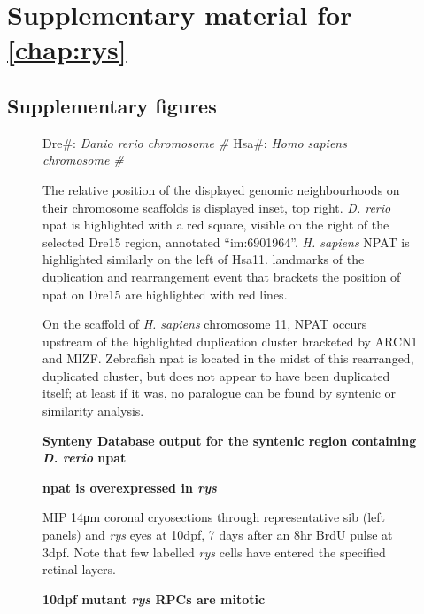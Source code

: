 \chapter{Supplementary material for \autoref{chap:rys}}
\section{Supplementary figures}

\begin{sidewaysfigure}[!h]
    \caption{{\bf Synteny Database output for the syntenic region containing \textit{D. rerio} npat}}
    Dre\#: \textit{Danio rerio chromosome \#}
    Hsa\#: \textit{Homo sapiens chromosome \#}

    The relative position of the displayed genomic neighbourhoods on their chromosome scaffolds is displayed inset, top right. \textit{D. rerio} npat is highlighted with a red square, visible on the right of the selected Dre15 region, annotated ``im:6901964''. \textit{H. sapiens} NPAT is highlighted similarly on the left of Hsa11. landmarks of the duplication and rearrangement event that brackets the position of npat on Dre15 are highlighted with red lines.

    On the scaffold of \textit{H. sapiens} chromosome 11, NPAT occurs upstream of the highlighted duplication cluster bracketed by ARCN1 and MIZF. Zebrafish npat is located in the midst of this rearranged, duplicated cluster, but does not appear to have been duplicated itself; at least if it was, no paralogue can be found by syntenic or similarity analysis.
    \label{synteny}
\end{sidewaysfigure}


\begin{figure}[!h]
    \caption{{\bf npat is overexpressed in \textit{rys}}} 
    \label{npatrtpcr}
\end{figure}

\begin{figure}[!h]
    \caption{{\bf 10dpf mutant \textit{rys} RPCs are mitotic}} MIP 14\si{\micro\metre} coronal cryosections through representative sib (left panels) and \textit{rys} eyes at 10dpf, 7 days after an 8hr BrdU pulse at 3dpf. Note that few labelled \textit{rys} cells have entered the specified retinal layers.
    \label{rysmitosis}
\end{figure}

